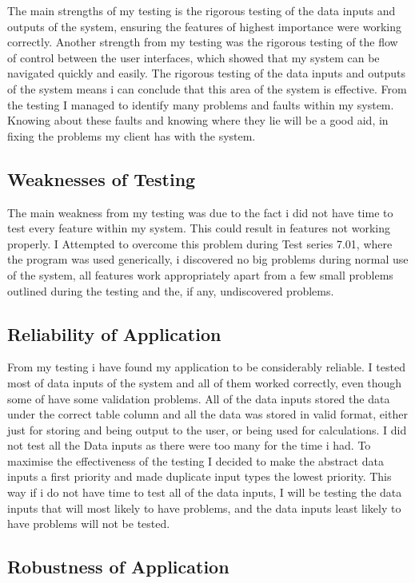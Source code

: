 The main strengths of my testing is the rigorous testing of the data inputs and outputs of the system, ensuring the features of highest importance were working correctly. Another strength from my testing was the rigorous testing of the flow of control between the user interfaces, which showed that my system can be navigated quickly and easily. The rigorous testing of the data inputs and outputs of the system means i can conclude that this area of the system is effective. From the testing I managed to identify many problems and faults within my system. Knowing about these faults and knowing where they lie will be a good aid, in fixing the problems my client has with the system.

\subsection{Weaknesses of Testing}

The main weakness from my testing was due to the fact i did not have time to test every feature within my system. This could result in features not working properly. I Attempted to overcome this problem during Test series 7.01, where the program was used generically, i discovered no big problems during normal use of the system, all features work appropriately apart from a few small problems outlined during the testing and the, if any, undiscovered problems.

\subsection{Reliability of Application}

From my testing i have found my application to be considerably reliable. I tested most of data inputs of the system and all of them worked correctly, even though some of have some validation problems. All of the data inputs stored the data under the correct table column and all the data was stored in valid format, either just for storing and being output to the user, or being used for  calculations. I did not test all the Data inputs as there were too many for the time i had. To maximise the effectiveness of the testing I decided to make the abstract data inputs a first priority and made duplicate input types the lowest priority. This way if i do not have time to test all of the data inputs, I will  be testing the data inputs that will most likely to have problems, and the data inputs least likely to have problems will not be tested. 

\subsection{Robustness of Application}

